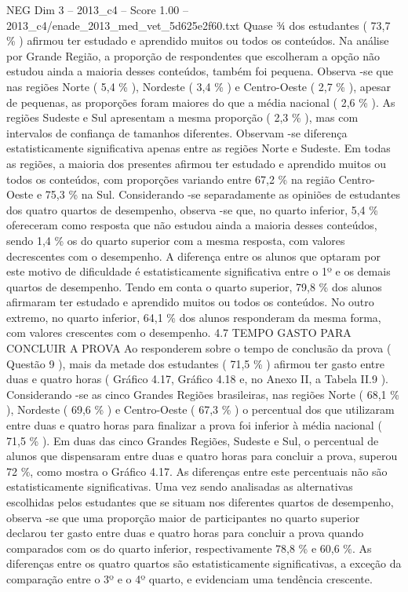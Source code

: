 \begin{textsample}{NEG Dim 3 – 2013\_c4 – Score 1.00 – 2013\_c4/enade\_2013\_med\_vet\_5d625e2f60.txt}
Quase ¾ dos estudantes ( 73,7 \% ) afirmou ter estudado e aprendido muitos ou todos os conteúdos.
Na análise por Grande Região, a proporção de respondentes que escolheram a opção não estudou ainda a maioria desses conteúdos, também foi pequena.
Observa -se que nas regiões Norte ( 5,4 \% ), Nordeste ( 3,4 \% ) e Centro-Oeste ( 2,7 \% ), apesar de pequenas, as proporções foram maiores do que a média nacional ( 2,6 \% ).
As regiões Sudeste e Sul apresentam a mesma proporção ( 2,3 \% ), mas com intervalos de confiança de tamanhos diferentes.
Observam -se diferença estatisticamente significativa apenas entre as regiões Norte e Sudeste.
Em todas as regiões, a maioria dos presentes afirmou ter estudado e aprendido muitos ou todos os conteúdos, com proporções variando entre 67,2 \% na região Centro-Oeste e 75,3 \% na Sul.
Considerando -se separadamente as opiniões de estudantes dos quatro quartos de desempenho, observa -se que, no quarto inferior, 5,4 \% ofereceram como resposta que não estudou ainda a maioria desses conteúdos, sendo 1,4 \% os do quarto superior com a mesma resposta, com valores decrescentes com o desempenho.
A diferença entre os alunos que optaram por este motivo de dificuldade é estatisticamente significativa entre o 1º e os demais quartos de desempenho.
Tendo em conta o quarto superior, 79,8 \% dos alunos afirmaram ter estudado e aprendido muitos ou todos os conteúdos.
No outro extremo, no quarto inferior, 64,1 \% dos alunos responderam da mesma forma, com valores crescentes com o desempenho. 4.7 TEMPO GASTO PARA CONCLUIR A PROVA Ao responderem sobre o tempo de conclusão da prova ( Questão 9 ), mais da metade dos estudantes ( 71,5 \% ) afirmou ter gasto entre duas e quatro horas ( Gráfico 4.17, Gráfico 4.18 e, no Anexo II, a Tabela II.9 ).
Considerando -se as cinco Grandes Regiões brasileiras, nas regiões Norte ( 68,1 \% ), Nordeste ( 69,6 \% ) e Centro-Oeste ( 67,3 \% ) o percentual dos que utilizaram entre duas e quatro horas para finalizar a prova foi inferior à média nacional ( 71,5 \% ).
Em duas das cinco Grandes Regiões, Sudeste e Sul, o percentual de alunos que dispensaram entre duas e quatro horas para concluir a prova, superou 72 \%, como mostra o Gráfico 4.17.
As diferenças entre este percentuais não são estatisticamente significativas.
Uma vez sendo analisadas as alternativas escolhidas pelos estudantes que se situam nos diferentes quartos de desempenho, observa -se que uma proporção maior de participantes no quarto superior declarou ter gasto entre duas e quatro horas para concluir a prova quando comparados com os do quarto inferior, respectivamente 78,8 \% e 60,6 \%.
As diferenças entre os quatro quartos são estatisticamente significativas, a exceção da comparação entre o 3º e o 4º quarto, e evidenciam uma tendência crescente.

\end{textsample}
